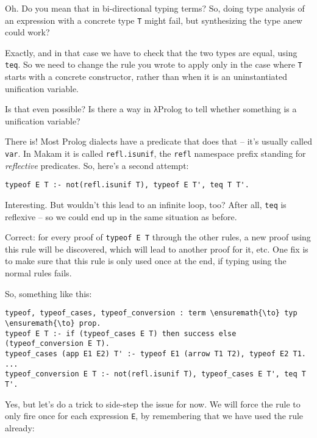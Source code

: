 \heroSTUDENT{} Oh. Do you mean that in bi-directional typing terms? So, doing
type analysis of an expression with a concrete type \texttt{T} might
fail, but synthesizing the type anew could work?

\heroADVISOR{} Exactly, and in that case we have to check that the two types
are equal, using \texttt{teq}. So we need to change the rule you wrote
to apply only in the case where \texttt{T} starts with a concrete
constructor, rather than when it is an uninstantiated unification
variable.

\heroSTUDENT{} Is that even possible? Is there a way in \foreignlanguage{greek}{λ}Prolog to tell
whether something is a unification variable?

\heroADVISOR{} There is! Most Prolog dialects have a predicate that does that
-- it's usually called \texttt{var}. In Makam it is called
\texttt{refl.isunif}, the \texttt{refl} namespace prefix standing for
\emph{reflective} predicates. So, here's a second attempt:

\begin{verbatim}
typeof E T :- not(refl.isunif T), typeof E T', teq T T'.
\end{verbatim}

\heroSTUDENT{} Interesting. But wouldn't this lead to an infinite loop, too?
After all, \texttt{teq} is reflexive -- so we could end up in the same
situation as before.

\heroADVISOR{} Correct: for every proof of
\texttt{typeof\ E\ T\textquotesingle{}} through the other rules, a new
proof using this rule will be discovered, which will lead to another
proof for it, etc. One fix is to make sure that this rule is only used
once at the end, if typing using the normal rules fails.

\heroSTUDENT{} So, something like this:

\begin{verbatim}
typeof, typeof_cases, typeof_conversion : term \ensuremath{\to} typ \ensuremath{\to} prop.
typeof E T :- if (typeof_cases E T) then success else (typeof_conversion E T).
typeof_cases (app E1 E2) T' :- typeof E1 (arrow T1 T2), typeof E2 T1.
...
typeof_conversion E T :- not(refl.isunif T), typeof_cases E T', teq T T'.
\end{verbatim}

\heroADVISOR{} Yes, but let's do a trick to side-step the issue for now. We
will force the rule to only fire once for each expression \texttt{E}, by
remembering that we have used the rule already:

